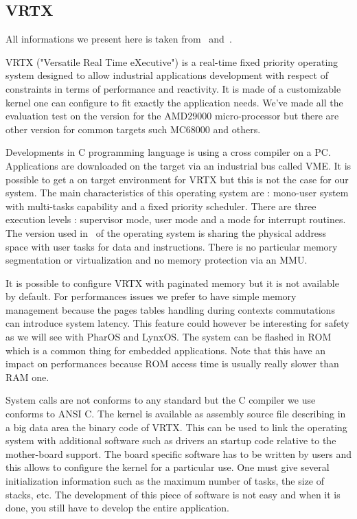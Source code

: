 \documentclass[10pt]{report}
\begin{document}
\subsection{VRTX}

All informations we present here is taken from~\cite{VRTX:90} and~\cite{AMD29000:91}.

VRTX ("Versatile Real Time eXecutive") is a real-time fixed priority operating system designed to allow industrial applications
development with respect of constraints in terms of performance and reactivity. It is made of a customizable kernel one can
configure to fit exactly the application needs. We've made all the evaluation test on the version for the AMD29000 micro-processor
but there are other version for common targets such MC68000 and others.

Developments in C programming language is using a cross compiler on a PC. Applications are downloaded on the target via an
industrial bus called VME. It is possible to get a on target environment for VRTX but this is not the case for our system.
The main characteristics of this operating system are : mono-user system with multi-tasks capability and a fixed priority
scheduler. There are three execution levels : supervisor mode, user mode and a mode for interrupt routines. The version used
in~\cite{Delchini:95} of the operating system is sharing the physical address space with user tasks for data and instructions.
There is no particular memory segmentation or virtualization and no memory protection via an MMU.

It is possible to configure VRTX with paginated memory but it is not available by default. For performances issues we prefer
to have simple memory management because the pages tables handling during contexts commutations can introduce system latency.
This feature could however be interesting for safety as we will see with PharOS and LynxOS. The system can be flashed in ROM
which is a common thing for embedded applications. Note that this have an impact on performances because ROM access time is
usually really slower than RAM one.

System calls are not conforms to any standard but the C compiler we use conforms to ANSI C. The kernel is available as assembly
source file describing in a big data area the binary code of VRTX. This can be used to link the operating system with additional
software such as drivers an startup code relative to the mother-board support. The board specific software has to be written
by users and this allows to configure the kernel for a particular use. One must give several initialization information such
as the maximum number of tasks, the size of stacks, etc. The development of this piece of software is not easy and when it is
done, you still have to develop the entire application.
\end{document}

